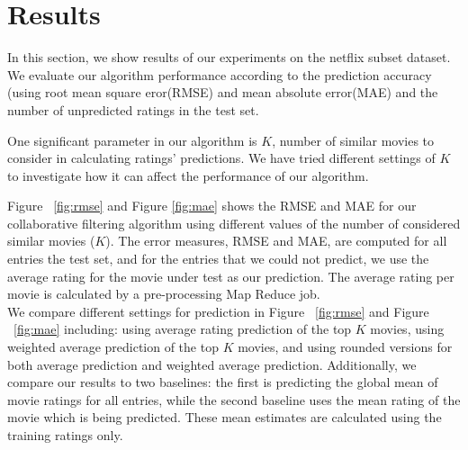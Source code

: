 \section{Results}
In this section, we show results of our experiments on the netflix subset dataset. We evaluate our algorithm performance according to the prediction accuracy (using root mean square eror(RMSE) and mean absolute error(MAE) and the number of unpredicted ratings in the test set.

One significant parameter in our algorithm is $K$, number of similar movies to consider in calculating ratings' predictions. We have tried different settings of $K$ to investigate how it can affect the performance of our algorithm. 







Figure ~\ref{fig:rmse} and Figure \ref{fig:mae} shows the RMSE and MAE for our collaborative filtering algorithm using different values of the number of considered similar movies ($K$). The error measures, RMSE and MAE, are computed for all entries the test set, and for the entries that we could not predict, we use the average rating for the movie under test as our prediction. The average rating per movie is calculated by a pre-processing Map Reduce job. \\

We compare different settings for prediction in Figure ~\ref{fig:rmse} and Figure ~\ref{fig:mae} including: using average rating prediction of the top $K$ movies, using weighted average prediction of the top $K$ movies, and using rounded versions for both average prediction and weighted average prediction. Additionally, we compare our results to two baselines: the first is predicting the global mean of movie ratings for all entries, while the second baseline uses the mean rating of the movie which is being predicted. These mean estimates are calculated using the training ratings only.\\

